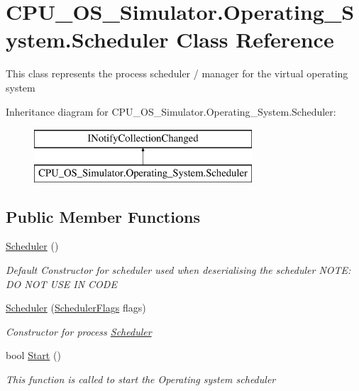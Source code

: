 \hypertarget{class_c_p_u___o_s___simulator_1_1_operating___system_1_1_scheduler}{}\section{C\+P\+U\+\_\+\+O\+S\+\_\+\+Simulator.\+Operating\+\_\+\+System.\+Scheduler Class Reference}
\label{class_c_p_u___o_s___simulator_1_1_operating___system_1_1_scheduler}


This class represents the process scheduler / manager for the virtual operating system  


Inheritance diagram for C\+P\+U\+\_\+\+O\+S\+\_\+\+Simulator.\+Operating\+\_\+\+System.\+Scheduler\+:\begin{figure}[H]
\begin{center}
\leavevmode
\includegraphics[height=2.000000cm]{class_c_p_u___o_s___simulator_1_1_operating___system_1_1_scheduler}
\end{center}
\end{figure}
\subsection*{Public Member Functions}
\begin{DoxyCompactItemize}
\item 
\hyperlink{class_c_p_u___o_s___simulator_1_1_operating___system_1_1_scheduler_a5911adf7a88d4bc66f0de915bb925461}{Scheduler} ()
\begin{DoxyCompactList}\small\item\em Default Constructor for scheduler used when deserialising the scheduler N\+O\+T\+E\+: D\+O N\+O\+T U\+S\+E I\+N C\+O\+D\+E \end{DoxyCompactList}\item 
\hyperlink{class_c_p_u___o_s___simulator_1_1_operating___system_1_1_scheduler_a686c31e6925c34fa366b0dfee0881950}{Scheduler} (\hyperlink{struct_c_p_u___o_s___simulator_1_1_operating___system_1_1_scheduler_flags}{Scheduler\+Flags} flags)
\begin{DoxyCompactList}\small\item\em Constructor for process \hyperlink{class_c_p_u___o_s___simulator_1_1_operating___system_1_1_scheduler}{Scheduler} \end{DoxyCompactList}\item 
bool \hyperlink{class_c_p_u___o_s___simulator_1_1_operating___system_1_1_scheduler_a0c5d3add7cf99eeb8c58c0a009ba6741}{Start} ()
\begin{DoxyCompactList}\small\item\em This function is called to start the Operating system scheduler \end{DoxyCompactList}\end{DoxyCompactItemize}
